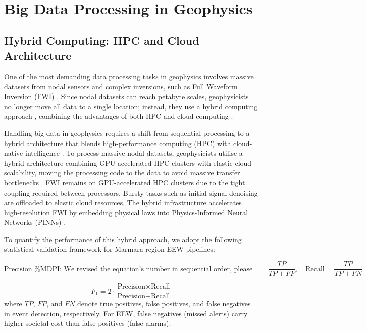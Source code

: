 \documentclass[data,article,accept,pdftex,moreauthors]{Definitions/mdpi}
\begin{document}
\section{Big Data Processing in Geophysics}

\subsection{Hybrid Computing: HPC and Cloud Architecture}

One of the most demanding data processing tasks in geophysics involves massive datasets from nodal sensors and complex inversions, such as Full Waveform Inversion (FWI) \cite{xue2024real,witte2019scalable,abdellaziz2024optimal}. Since nodal datasets can reach petabyte scales, geophysicists no longer move all data to a single location; instead, they use a hybrid computing approach \cite{peter2011forward}, combining the advantages of both HPC and cloud computing \cite{ejarque2022enabling,assuncao2015big}.

Handling big data in geophysics requires a shift from sequential processing to a hybrid architecture that blends high-performance computing (HPC) with cloud-native intelligence \cite{ejarque2022enablinghashem2015rise}. To process massive nodal datasets, geophysicists utilise a hybrid architecture combining GPU-accelerated HPC clusters with elastic cloud scalability, moving the processing code to the data to avoid massive transfer bottlenecks \cite{krauss2023seismology,maccarthy2020seismology}. FWI remains on GPU-accelerated HPC clusters due to the tight coupling required between processors. Bursty tasks such as initial signal denoising are offloaded to elastic cloud resources. The hybrid infrastructure accelerates high-resolution FWI by embedding physical laws into Physics-Informed Neural Networks (PINNs) \cite{raissi2019physics}.

To quantify the performance of this hybrid approach, we adopt the following statistical validation framework for Marmara-region EEW pipelines:

\begin{equation}
\text{Precision %
} = \frac{TP}{TP + FP}, \quad \text{Recall} = \frac{TP}{TP + FN}
\end{equation}

\begin{equation}
F_1 = 2 \cdot \frac{\text{Precision} \times \text{Recall}}{\text{Precision} + \text{Recall}}
\end{equation}
where $TP$, $FP$, and $FN$ denote true positives, false positives, and false negatives in event detection, respectively. For EEW, false negatives (missed alerts) carry higher societal cost than false positives (false alarms).
\end{document}
